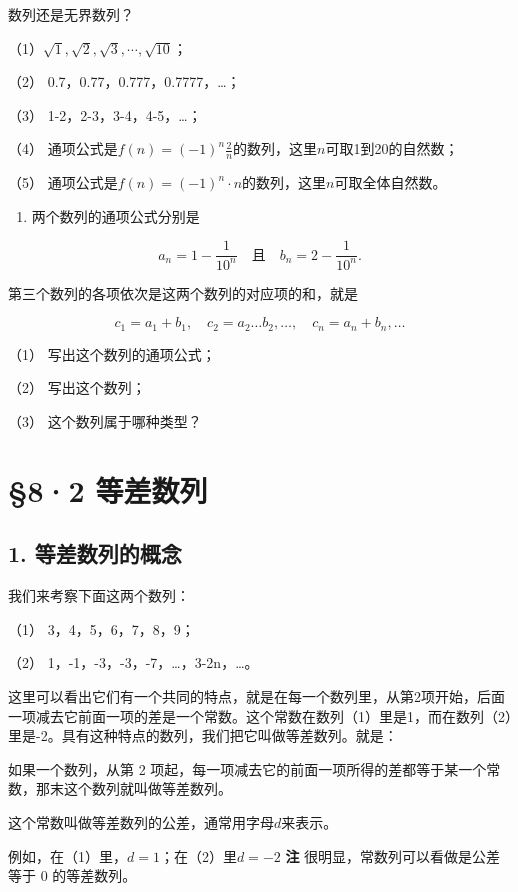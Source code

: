 数列还是无界数列？

（1）\(\sqrt{1}, \sqrt{2}, \sqrt{3}, \cdots, \sqrt{10}\)；

（2） 0.7，0.77，0.777，0.7777，\ldots；

（3） 1-2，2-3，3-4，4-5，\ldots；

（4）
通项公式是\(f(n) = (-1)^n \frac{2}{n}\)的数列，这里\(n\)可取1到20的自然数；

（5）
通项公式是\(f(n) = (-1)^n \cdot n\)的数列，这里\(n\)可取全体自然数。

\begin{enumerate}[start=8]
\item
  两个数列的通项公式分别是
\end{enumerate}

\[
a_{n} = 1 - \frac{1}{10^{n}} \quad \text{且} \quad b_{n} = 2 - \frac{1}{10^{n}}.
\]

第三个数列的各项依次是这两个数列的对应项的和，就是

\[
c_{1} = a_{1} + b_{1}, \quad c_{2} = a_{2} \dots b_{2}, \dots, \quad c_{n} = a_{n} + b_{n}, \dots
\]

（1） 写出这个数列的通项公式；

（2） 写出这个数列；

（3） 这个数列属于哪种类型？

\section{§8·2 等差数列}

\subsection{1. 等差数列的概念}

我们来考察下面这两个数列：

（1） 3，4，5，6，7，8，9；

（2） 1，-1，-3，-3，-7，\ldots，3-2n，\ldots。

这里可以看出它们有一个共同的特点，就是在每一个数列里，从第2项开始，后面一项减去它前面一项的差是一个常数。这个常数在数列（1）里是1，而在数列（2）里是-2。具有这种特点的数列，我们把它叫做等差数列。就是：

如果一个数列，从第 2
项起，每一项减去它的前面一项所得的差都等于某一个常数，那末这个数列就叫做等差数列。

这个常数叫做等差数列的公差，通常用字母\(d\)来表示。

例如，在（1）里，\(d = 1\)；在（2）里\(d = -2\) \textbf{注}
很明显，常数列可以看做是公差等于 0 的等差数列。

